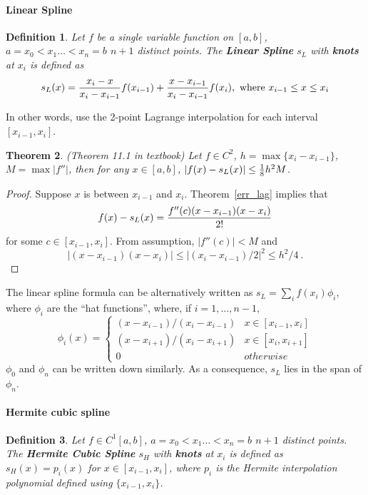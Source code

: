 \documentclass{article} %
\theoremstyle{break}
\newtheorem{definition}{Definition}[section]
\newtheorem{thm}[definition]{Theorem}
\begin{document}
\paragraph{Linear Spline}

\begin{definition}
  Let $f$ be a single variable function on $[a, b]$, $a=x_0<x_1\dots <x_n=b$ $n+1$ distinct points. The {\bf Linear Spline} $s_L$ with {\bf knots} at $x_i$ is defined as
  \[s_L(x)={x_i-x\over x_i-x_{i-1}}f(x_{i-1})+{x-x_{i-1}\over x_i-x_{i-1}}f(x_i), \text{ where }x_{i-1}\leq x\leq x_i\]
\end{definition}
In other words, use the 2-point Lagrange interpolation for each interval $[x_{i-1}, x_i]$.\\


\begin{thm}\label{err_spline_lin} (Theorem 11.1 in textbook)
Let $f\in C^2$, $h=\max\{x_i-x_{i-1}\}$, $M=\max|f''|$, then for any $x\in [a, b]$, $|f(x)-s_L(x)|\leq {1\over 8}h^2M$.
\end{thm}

\begin{proof}
  Suppose $x$ is between $x_{i-1}$ and $x_i$. Theorem~\ref{err_lag} implies that
  \[f(x)-s_L(x)={f''(c)(x-x_{i-1})(x-x_i)\over 2!}\]
  for some $c\in [x_{i-1}, x_i]$. From assumption, $|f''(c)|<M$ and
  \[|(x-x_{i-1})(x-x_i)|\leq|(x_i-x_{i-1})/2|^2\leq h^2/4\ .\]
\end{proof}

The linear spline formula can be alternatively written as $s_L=\sum_if(x_i)\phi_i$, where $\phi_i$ are the ``hat functions'', where, if $i=1, \dots, n-1$,
\[\phi_i(x)=\begin{cases} (x-x_{i-1})/(x_i-x_{i-1}) & x\in [x_{i-1}, x_i]\\
    (x-x_{i+1})/(x_i-x_{i+1}) & x\in [x_i, x_{i+1}] \\ 0 & otherwise \end{cases}\]
$\phi_0$ and $\phi_n$ can be written down similarly. As a consequence, $s_L$ lies in the span of $\phi_n$. \\


\paragraph{Hermite cubic spline}

\begin{definition} Let $f\in C^1[a, b]$,  $a=x_0<x_1\dots <x_n=b$ $n+1$ distinct points. The {\bf Hermite Cubic Spline} $s_H$ with {\bf knots} at $x_i$ is defined as $s_H(x)=p_i(x)$ for $x\in [x_{i-1}, x_i]$, where $p_i$ is the Hermite interpolation polynomial defined using $\{x_{i-1}, x_i\}$.
\end{definition}
\end{document}

